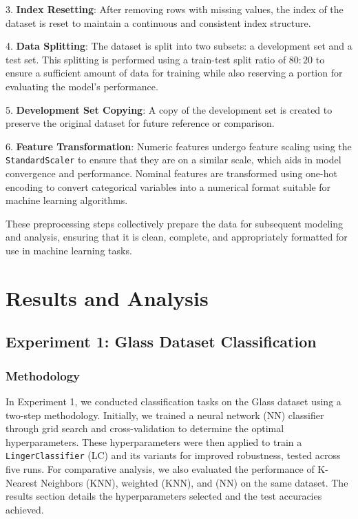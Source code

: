 \documentclass[a4paper, 12pt]{report}
\begin{document}
3. \textbf{Index Resetting}: After removing rows with missing values, the index of the dataset is reset to maintain a continuous and consistent index structure.

4. \textbf{Data Splitting}: The dataset is split into two subsets: a development set and a test set. 
This splitting is performed using a train-test split ratio of $80:20$ to ensure a sufficient amount of data for training while also reserving a portion for evaluating the model's performance.

5. \textbf{Development Set Copying}: A copy of the development set is created to preserve the original dataset for future reference or comparison.

6. \textbf{Feature Transformation}: Numeric features undergo feature scaling using the \texttt{StandardScaler} to ensure that they are on a similar scale, 
which aids in model convergence and performance. Nominal features are transformed using one-hot encoding to convert categorical variables into a numerical format 
suitable for machine learning algorithms.

These preprocessing steps collectively prepare the data for subsequent modeling and analysis, ensuring that it is clean, complete, and 
appropriately formatted for use in machine learning tasks.

\section{Results and Analysis}

\subsection{Experiment 1: Glass Dataset Classification}

\subsubsection{Methodology}
In Experiment 1, we conducted classification tasks on the Glass dataset using a two-step methodology. Initially, we trained a neural network (NN) classifier 
through grid search and cross-validation to determine the optimal hyperparameters. These hyperparameters were then applied to train a \texttt{LingerClassifier} (LC) 
and its variants for improved robustness, tested across five runs. For comparative analysis, we also evaluated the performance of K-Nearest Neighbors (KNN), 
weighted (KNN), and (NN) on the same dataset. The results section details the hyperparameters selected and the test accuracies achieved.
\end{document}
